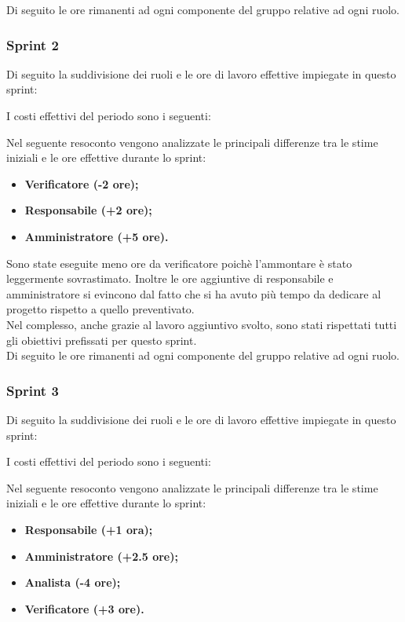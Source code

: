 Di seguito le ore rimanenti ad ogni componente del gruppo relative ad ogni
ruolo. 


\pagebreak
\subsubsection{Sprint 2}
Di seguito la suddivisione dei ruoli e le ore di lavoro effettive impiegate in
questo sprint:



I costi effettivi del periodo sono i seguenti:



Nel seguente resoconto vengono analizzate le principali differenze tra le stime iniziali e le ore effettive durante lo sprint:
\begin{itemize}
    \item \textbf{Verificatore (-2 ore);}
    \item \textbf{Responsabile (+2 ore);}
    \item \textbf{Amministratore (+5 ore).}
\end{itemize}
Sono state eseguite meno ore da verificatore poichè l'ammontare è stato leggermente sovrastimato.
Inoltre le ore aggiuntive di responsabile e amministratore si evincono dal fatto che si ha avuto più tempo da dedicare al progetto rispetto
a quello preventivato.
\\
Nel complesso, anche grazie al lavoro aggiuntivo svolto, sono stati rispettati tutti gli obiettivi prefissati per questo sprint.\\

Di seguito le ore rimanenti ad ogni componente del gruppo relative ad ogni
ruolo. 

\pagebreak
\subsubsection{Sprint 3}
Di seguito la suddivisione dei ruoli e le ore di lavoro effettive impiegate in
questo sprint:



I costi effettivi del periodo sono i seguenti:



Nel seguente resoconto vengono analizzate le principali differenze tra le stime iniziali e le ore effettive durante lo sprint:
\begin{itemize}
    \item \textbf{Responsabile (+1 ora);}
    \item \textbf{Amministratore (+2.5 ore);}
    \item \textbf{Analista (-4 ore);}
    \item \textbf{Verificatore (+3 ore).}
\end{itemize}

